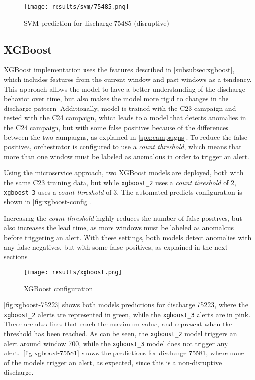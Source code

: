 \begin{figure}[H]
    \centering
    \texttt{[image: results/svm/75485.png]}
    \caption{SVM prediction for discharge 75485 (disruptive)}
    \label{fig:svm-75485}
\end{figure}

\subsection{XGBoost}

XGBoost implementation uses the features described in \autoref{subsubsec:xgboost}, which includes features from the current window and past windows as a tendency. This approach allows the model to have a better understanding of the discharge behavior over time, but also makes the model more rigid to changes in the discharge pattern. Additionally, model is trained with the C23 campaign and tested with the C24 campaign, which leads to a model that detects anomalies in the C24 campaign, but with some false positives because of the differences between the two campaigns, as explained in \autoref{apx:campaigns}. To reduce the false positives, orchestrator is configured to use a \textit{count threshold}, which means that more than one window must be labeled as anomalous in order to trigger an alert. 

Using the microservice approach, two XGBoost models are deployed, both with the same C23 training data, but while \texttt{xgboost\_2} uses a \textit{count threshold} of 2, \texttt{xgboost\_3} uses a \textit{count threshold} of 3. The automated predicts configuration is shown in \autoref{fig:xgboost-config}.

Increasing the \textit{count threshold} highly reduces the number of false positives, but also increases the lead time, as more windows must be labeled as anomalous before triggering an alert. With these settings, both models detect anomalies with any false negatives, but with some false positives, as explained in the next sections.

\begin{figure}[H]
    \centering
    \texttt{[image: results/xgboost.png]}
    \caption{XGBoost configuration}
    \label{fig:xgboost-config}
\end{figure}

\autoref{fig:xgboost-75223} shows both models predictions for discharge 75223, where the \texttt{xgboost\_2} alerts are represented in green, while the \texttt{xgboost\_3} alerts are in pink. There are also lines that reach the maximum value, and represent when the threshold has been reached. As can be seen, the \texttt{xgboost\_2} model triggers an alert around window 700, while the \texttt{xgboost\_3} model does not trigger any alert.\ \autoref{fig:xgboost-75581} shows the predictions for discharge 75581, where none of the models trigger an alert, as expected, since this is a non-disruptive discharge.


